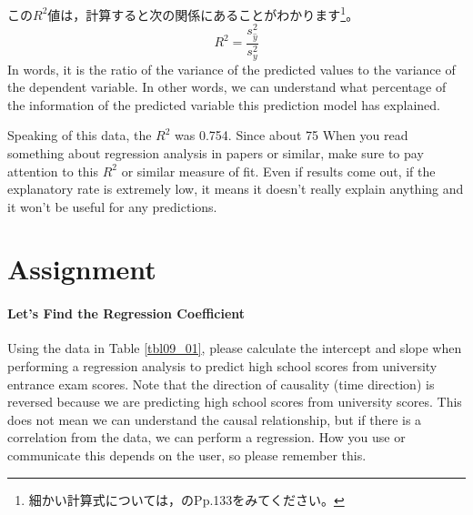 \documentclass{ltjbook}
\begin{document}
この$R^2$値は，計算すると次の関係にあることがわかります\footnote{細かい計算式については，\textcite{kosugi2018}のPp.133をみてください。}。
\[ R^2 = \frac{s_{\hat{y}}^2}{s_y^2} \]
In words, it is the ratio of the variance of the predicted values to the variance of the dependent variable. In other words, we can understand what percentage of the information of the predicted variable this prediction model has explained.

Speaking of this data, the $R^2$ was 0.754. Since about 75%
When you read something about regression analysis in papers or similar, make sure to pay attention to this $R^2$ or similar measure of fit. Even if results come out, if the explanatory rate is extremely low, it means it doesn't really explain anything and it won't be useful for any predictions.

\section{Assignment}
\paragraph{Let's Find the Regression Coefficient} Using the data in Table \ref{tbl09_01}, please calculate the intercept and slope when performing a regression analysis to predict high school scores from university entrance exam scores. Note that the direction of causality (time direction) is reversed because we are predicting high school scores from university scores. This does not mean we can understand the causal relationship, but if there is a correlation from the data, we can perform a regression. How you use or communicate this depends on the user, so please remember this.
\end{document}

